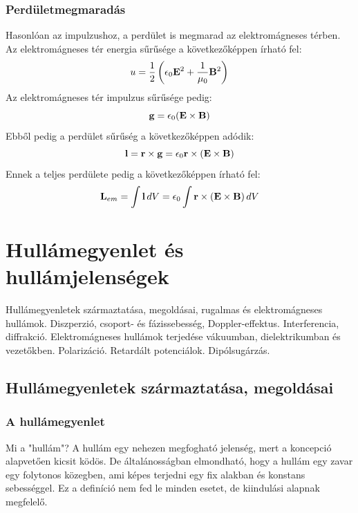\documentclass[a4paper,12pt]{article}
\begin{document}
\subsubsection*{Perdületmegmaradás}
Hasonlóan az impulzushoz, a perdület is megmarad az elektromágneses térben. Az elektromágneses tér energia sűrűsége a következőképpen írható fel:
\begin{equation}
    u = \frac{1}{2} \left( \epsilon_0 \bold{E}^2 + \frac{1}{\mu_0} \bold{B}^2 \right)
\end{equation}
Az elektromágneses tér impulzus sűrűsége pedig:
\begin{equation}
    \bold{g} = \epsilon_0 (\bold{E} \times \bold{B})
\end{equation}
Ebből pedig a perdület sűrűség a következőképpen adódik:
\begin{equation}
    \bold{l} = \bold{r} \times \bold{g} = \epsilon_0 \bold{r} \times (\bold{E} \times \bold{B})
\end{equation}
Ennek a teljes perdülete pedig a következőképpen írható fel:
\begin{equation}
    \bold{L}_{em} = \int \bold{l} \, dV = \epsilon_0 \int \bold{r} \times (\bold{E} \times \bold{B}) \, dV
\end{equation}

\newpage
\section{Hullámegyenlet és hullámjelenségek \cite{electro_intro}}
Hullámegyenletek származtatása, megoldásai, rugalmas és elektromágneses hullámok. Diszperzió, csoport- és fázissebesség, Doppler-effektus.
Interferencia, diffrakció. Elektromágneses hullámok terjedése vákuumban, dielektrikumban és vezetőkben. Polarizáció. Retardált potenciálok. Dipólsugárzás.

\subsection{Hullámegyenletek származtatása, megoldásai}
\subsubsection{A hullámegyenlet}
Mi a "hullám"? A hullám egy nehezen megfogható jelenség, mert a koncepció alapvetően kicsit ködös. De általánosságban elmondható, hogy a hullám egy zavar egy folytonos közegben,
ami képes terjedni egy fix alakban és konstans sebességgel. Ez a definíció nem fed le minden esetet, de kiindulási alapnak megfelelő.
\end{document}
